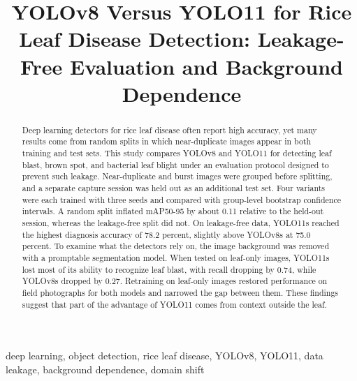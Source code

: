 \documentclass[conference,a4paper]{IEEEtran}
\begin{document}
\title{YOLOv8 Versus YOLO11 for Rice Leaf Disease Detection: Leakage-Free Evaluation and Background Dependence}

\author{
    \and
}

\maketitle

\begin{abstract}
Deep learning detectors for rice leaf disease often report high accuracy, yet many results come from random splits in which near-duplicate images appear in both training and test sets. This study compares YOLOv8 and YOLO11 for detecting leaf blast, brown spot, and bacterial leaf blight under an evaluation protocol designed to prevent such leakage. Near-duplicate and burst images were grouped before splitting, and a separate capture session was held out as an additional test set. Four variants were each trained with three seeds and compared with group-level bootstrap confidence intervals. A random split inflated mAP50-95 by about 0.11 relative to the held-out session, whereas the leakage-free split did not. On leakage-free data, YOLO11s reached the highest diagnosis accuracy of 78.2 percent, slightly above YOLOv8s at 75.0 percent. To examine what the detectors rely on, the image background was removed with a promptable segmentation model. When tested on leaf-only images, YOLO11s lost most of its ability to recognize leaf blast, with recall dropping by 0.74, while YOLOv8s dropped by 0.27. Retraining on leaf-only images restored performance on field photographs for both models and narrowed the gap between them. These findings suggest that part of the advantage of YOLO11 comes from context outside the leaf.
\end{abstract}

\begin{IEEEkeywords}
deep learning, object detection, rice leaf disease, YOLOv8, YOLO11, data leakage, background dependence, domain shift
\end{IEEEkeywords}
\end{document}
